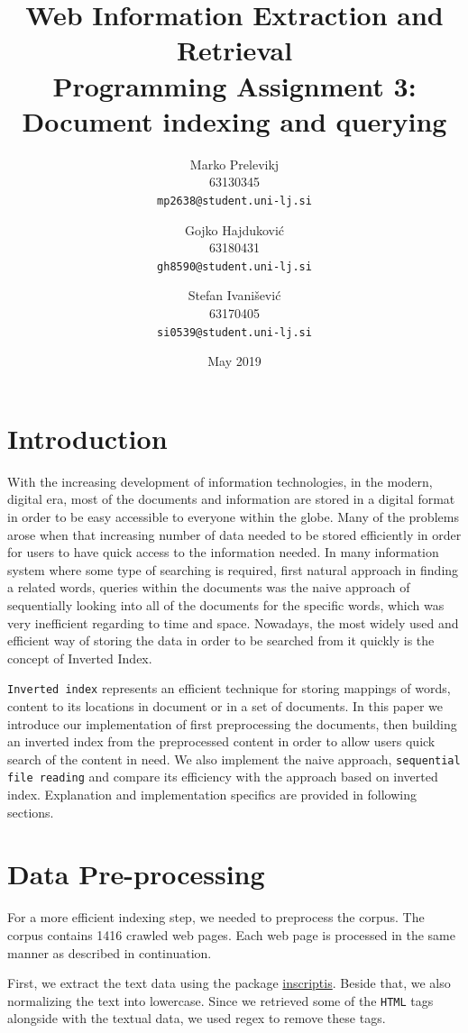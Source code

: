 \documentclass{article}
\title{
	Web Information Extraction and Retrieval\\
	Programming Assignment 3: \\
	Document indexing and querying
}
\author{
	Marko Prelevikj\\
	63130345\\
	\texttt{mp2638@student.uni-lj.si}
	\and
	Gojko Hajduković\\
	63180431\\
	\texttt{gh8590@student.uni-lj.si}
	\and
	Stefan Ivanišević\\
	63170405\\
	\texttt{si0539@student.uni-lj.si}
}
\date{May 2019}
\begin{document}
	
	\maketitle
	\section{Introduction}
	With the increasing development of information technologies, in the modern, digital era, most of the documents and information are stored in a digital format in order to be easy accessible to everyone within the globe. Many of the problems arose when that increasing number of data needed to be stored efficiently in order for users to have quick access to the information needed. In many information system where some type of searching is required, first natural approach in finding a related words, queries within the documents was the naive approach of sequentially looking into all of the documents for the specific words, which was very inefficient regarding to time and space. Nowadays, the most widely used and efficient way of storing the data in order to be searched from it quickly is the concept of Inverted Index.
	
	\texttt{Inverted index} represents an efficient technique for storing mappings of words, content to its locations in document or in a set of documents. In this paper we introduce our implementation of first preprocessing the documents, then building an inverted index from the preprocessed content in order to allow users quick search of the content in need. We also implement the naive approach, \texttt{sequential file reading} and compare its efficiency with the approach based on inverted index. Explanation and implementation specifics are provided in following sections.
	
	\section{Data Pre-processing} \label{sec:Preprocess}
	For a more efficient indexing step, we needed to preprocess the corpus. The corpus contains 1416 crawled web pages. Each web page is processed in the same manner as described in continuation.
	
	First, we extract the text data using the package \href{https://pypi.org/project/inscriptis/}{inscriptis}. Beside that, we also normalizing the text into lowercase. Since we retrieved some of the \texttt{HTML} tags alongside with the textual data, we used regex to remove these tags.
	
\end{document}
